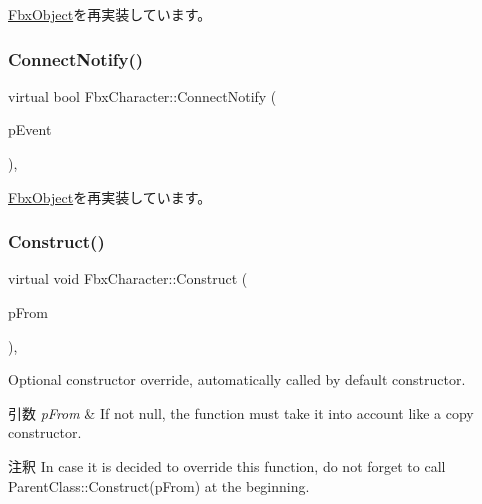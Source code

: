 \hyperlink{class_fbx_object_ad553a4262b09cb57c3171a93edadbab8}{Fbx\+Object}を再実装しています。

\mbox{\label{class_fbx_character_a42e5f6d72c0669b6eedf0cb511720845}} 
\subsubsection{\texorpdfstring{Connect\+Notify()}{ConnectNotify()}}
{\footnotesize\ttfamily virtual bool Fbx\+Character\+::\+Connect\+Notify (\begin{DoxyParamCaption}\item[{\hyperlink{class_fbx_connect_event}{Fbx\+Connect\+Event} const \&}]{p\+Event }\end{DoxyParamCaption})\hspace{0.3cm}{\ttfamily [protected]}, {\ttfamily [virtual]}}



\hyperlink{class_fbx_object_ab7a400f3829d1f0da57d3d78c8168dd0}{Fbx\+Object}を再実装しています。

\mbox{\label{class_fbx_character_afccb9b74c28560f04f05581a55c0b58a}} 
\subsubsection{\texorpdfstring{Construct()}{Construct()}}
{\footnotesize\ttfamily virtual void Fbx\+Character\+::\+Construct (\begin{DoxyParamCaption}\item[{const \hyperlink{class_fbx_object}{Fbx\+Object} $\ast$}]{p\+From }\end{DoxyParamCaption})\hspace{0.3cm}{\ttfamily [protected]}, {\ttfamily [virtual]}}

Optional constructor override, automatically called by default constructor. 
\begin{DoxyParams}{引数}
{\em p\+From} & If not null, the function must take it into account like a copy constructor. \\
\hline
\end{DoxyParams}
\begin{DoxyRemark}{注釈}
In case it is decided to override this function, do not forget to call Parent\+Class\+::\+Construct(p\+From) at the beginning. 
\end{DoxyRemark}


